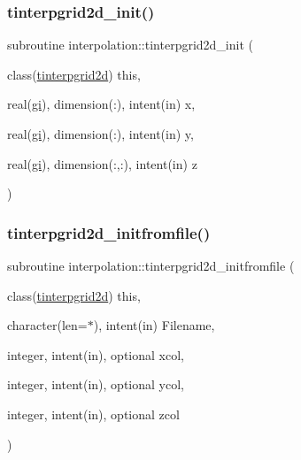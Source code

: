 \subsubsection{\texorpdfstring{tinterpgrid2d\+\_\+init()}{tinterpgrid2d\_init()}}
{\footnotesize\ttfamily subroutine interpolation\+::tinterpgrid2d\+\_\+init (\begin{DoxyParamCaption}\item[{class(\mbox{\hyperlink{structinterpolation_1_1tinterpgrid2d}{tinterpgrid2d}})}]{this,  }\item[{real(\mbox{\hyperlink{namespaceinterpolation_a7242dea48715e8170bae81efe12c64be}{gi}}), dimension(\+:), intent(in)}]{x,  }\item[{real(\mbox{\hyperlink{namespaceinterpolation_a7242dea48715e8170bae81efe12c64be}{gi}}), dimension(\+:), intent(in)}]{y,  }\item[{real(\mbox{\hyperlink{namespaceinterpolation_a7242dea48715e8170bae81efe12c64be}{gi}}), dimension(\+:,\+:), intent(in)}]{z }\end{DoxyParamCaption})}

\mbox{\label{namespaceinterpolation_aad92c485265e298041ddb85fdc576ca1}} 
\subsubsection{\texorpdfstring{tinterpgrid2d\+\_\+initfromfile()}{tinterpgrid2d\_initfromfile()}}
{\footnotesize\ttfamily subroutine interpolation\+::tinterpgrid2d\+\_\+initfromfile (\begin{DoxyParamCaption}\item[{class(\mbox{\hyperlink{structinterpolation_1_1tinterpgrid2d}{tinterpgrid2d}})}]{this,  }\item[{character(len=$\ast$), intent(in)}]{Filename,  }\item[{integer, intent(in), optional}]{xcol,  }\item[{integer, intent(in), optional}]{ycol,  }\item[{integer, intent(in), optional}]{zcol }\end{DoxyParamCaption})}

\mbox{\label{namespaceinterpolation_a3420758fce41c1a63122fd3d35b973eb}} 
